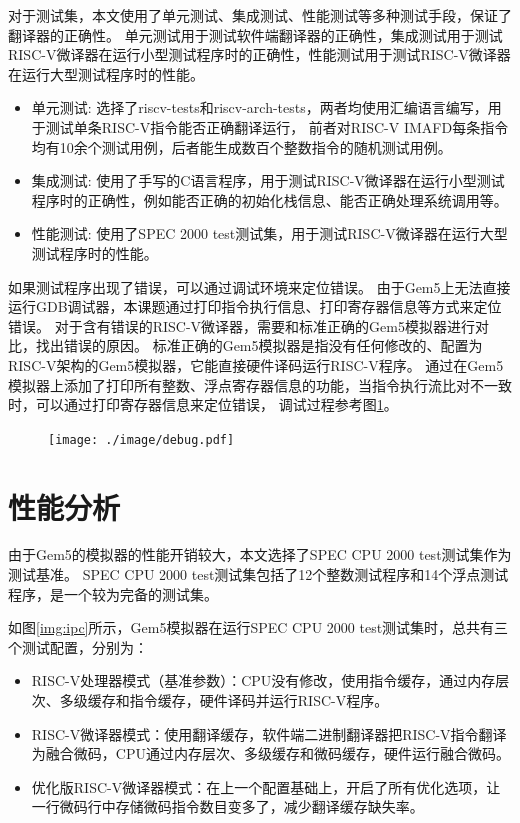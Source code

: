 对于测试集，本文使用了单元测试、集成测试、性能测试等多种测试手段，保证了翻译器的正确性。
单元测试用于测试软件端翻译器的正确性，集成测试用于测试RISC-V微译器在运行小型测试程序时的正确性，性能测试用于测试RISC-V微译器在运行大型测试程序时的性能。
\begin{itemize}
\item 单元测试: 选择了riscv-tests\cite{riscv-tests}和riscv-arch-tests\cite{riscv-arch-tests}，两者均使用汇编语言编写，用于测试单条RISC-V指令能否正确翻译运行，
前者对RISC-V IMAFD每条指令均有10余个测试用例，后者能生成数百个整数指令的随机测试用例。
\item 集成测试: 使用了手写的C语言程序，用于测试RISC-V微译器在运行小型测试程序时的正确性，例如能否正确的初始化栈信息、能否正确处理系统调用等。
\item 性能测试: 使用了SPEC 2000 test测试集，用于测试RISC-V微译器在运行大型测试程序时的性能。
\end{itemize}

如果测试程序出现了错误，可以通过调试环境来定位错误。
由于Gem5上无法直接运行GDB调试器，本课题通过打印指令执行信息、打印寄存器信息等方式来定位错误。
对于含有错误的RISC-V微译器，需要和标准正确的Gem5模拟器进行对比，找出错误的原因。
标准正确的Gem5模拟器是指没有任何修改的、配置为RISC-V架构的Gem5模拟器，它能直接硬件译码运行RISC-V程序。
通过在Gem5模拟器上添加了打印所有整数、浮点寄存器信息的功能，当指令执行流比对不一致时，可以通过打印寄存器信息来定位错误，
调试过程参考图\ref{img:debug}。

\begin{figure}[!htbp]
  \centering
  \texttt{[image: ./image/debug.pdf]}
  \label{img:debug}
\end{figure}

\section{性能分析}
由于Gem5的模拟器的性能开销较大，本文选择了SPEC CPU 2000 test测试集作为测试基准。
SPEC CPU 2000 test测试集包括了12个整数测试程序和14个浮点测试程序，是一个较为完备的测试集。

如图\ref{img:ipc}所示，Gem5模拟器在运行SPEC CPU 2000 test测试集时，总共有三个测试配置，分别为：
\begin{itemize}
  \item RISC-V处理器模式（基准参数）：CPU没有修改，使用指令缓存，通过内存层次、多级缓存和指令缓存，硬件译码并运行RISC-V程序。
  \item RISC-V微译器模式：使用翻译缓存，软件端二进制翻译器把RISC-V指令翻译为融合微码，CPU通过内存层次、多级缓存和微码缓存，硬件运行融合微码。
  \item 优化版RISC-V微译器模式：在上一个配置基础上，开启了所有优化选项，让一行微码行中存储微码指令数目变多了，减少翻译缓存缺失率。
\end{itemize}


